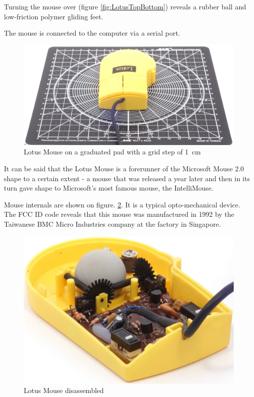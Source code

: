 \documentclass[11pt, a4paper]{article}
\begin{document}
Turning the mouse over (figure \ref{fig:LotusTopBottom}) reveals a rubber ball and low-friction polymer gliding feet.

The mouse is connected to the computer via a serial port.

\begin{figure}[h]
    \centering
    \includegraphics[scale=0.3]{1992_lotus_mouse/size_30.jpg}
    \caption{Lotus Mouse on a graduated pad with a grid step of 1~cm}
    \label{fig:LotusSize}
\end{figure}

It can be said that the Lotus Mouse is a forerunner of the Microsoft Mouse 2.0 shape to a certain extent - a mouse that was released a year later and then in its turn gave shape to Microsoft's most famous mouse, the IntelliMouse.

Mouse internals are shown on figure. \ref{fig:LotusInside}. It is a typical opto-mechanical device. The FCC ID code reveals that this mouse was manufactured in 1992 by the Taiwanese BMC Micro Industries company at the factory in Singapore.

\begin{figure}[h]
    \centering
    \includegraphics[scale=0.7]{1992_lotus_mouse/inside_30.jpg}
    \caption{Lotus Mouse disassembled}
    \label{fig:LotusInside}
\end{figure}
\end{document}
